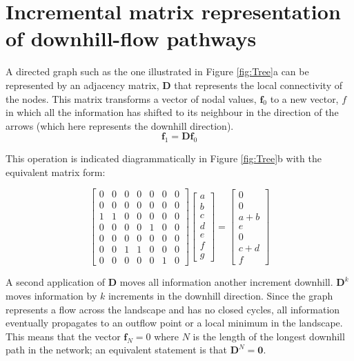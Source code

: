 \documentclass[draft,jgrga]{agu_template/AGUTeX}
\begin{document}
\section{Incremental matrix representation of downhill-flow pathways}

A directed graph such as the one illustrated in Figure \ref{fig:Tree}a can be represented by an adjacency matrix, $\bm{D}$ that represents the local connectivity of the nodes. This matrix transforms a vector of nodal values, $\bm{f}_0$ to a new vector, $f$ in which all the information has shifted to its neighbour in the direction of the arrows (which here represents the downhill direction).
\begin{equation}
	\bm{f}_1 = \bm{D} \bm{f}_0
\end{equation}

This operation is indicated diagrammatically in Figure \ref{fig:Tree}b with the equivalent matrix form:

\begin{equation}
\begin{bmatrix}
 0 & 0 & 0 & 0 & 0 & 0 & 0 \\
 0 & 0 & 0 & 0 & 0 & 0 & 0 \\
 1 & 1 & 0 & 0 & 0 & 0 & 0 \\
 0 & 0 & 0 & 0 & 1 & 0 & 0 \\
 0 & 0 & 0 & 0 & 0 & 0 & 0 \\
 0 & 0 & 1 & 1 & 0 & 0 & 0 \\
 0 & 0 & 0 & 0 & 0 & 1 & 0
\end{bmatrix}
\begin{bmatrix}
 a  \\
 b  \\
 c  \\
 d  \\
 e  \\
 f  \\
 g
\end{bmatrix} =
\begin{bmatrix}
 0  \\
 0  \\
 a+b  \\
 e  \\
 0  \\
 c+d  \\
 f
\end{bmatrix}
\end{equation}

A second application of $\bm{D}$ moves all information another increment downhill. $\bm{D}^k$ moves information by $k$ increments in the downhill direction. Since the graph represents a flow across the landscape and has no closed cycles, all information eventually propagates to an outflow point or a local minimum in the landscape. This means that the vector $\bm{f}_N = 0$ where $N$ is the length of the longest downhill path in the network;  an equivalent statement is that $\bm{D}^N = \bm{0}$.
\end{document}
